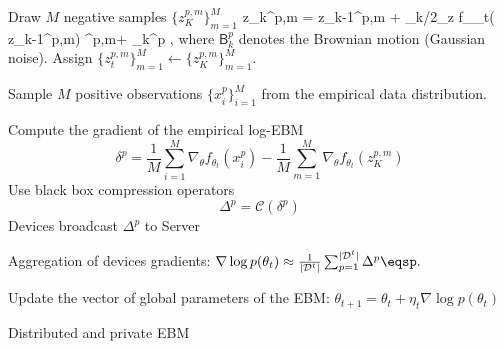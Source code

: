 \documentclass{article}
\begin{document}
\begin{algorithm}[H]
\DontPrintSemicolon
  
\hrulefill

{	
	
	{
		{Draw $M$ negative samples $\{ z_{K}^{p,m} \}_{m=1}^M$} 
			{
			\beq\notag
			z_{k}^{p,m} = z_{k-1}^{p,m} + \gamma_k/2\nabla_z f_{\theta_t}( z_{k-1}^{p,m})  ^{p,m}+  _k^p \eqsp,
			\eeq
			where $\mathsf{B}_k^p$ denotes the Brownian motion (Gaussian noise).
			}
		{Assign $\{ z_{t}^{p,m} \}_{m=1}^M \leftarrow \{ z_{K}^{p,m} \}_{m=1}^M$.}
		
		{Sample $M$ positive observations $\{ x^p_{i} \}_{i=1}^M$ from the empirical data distribution.}
		
		{Compute the gradient of the empirical log-EBM} 
		{
		$$\delta^p = \frac{1}{M} \sum_{i=1}^{M} \nabla_{\theta} f_{\theta_t}\left(x^p_{i}\right)- \frac{1}{M} 	\sum_{m=1}^{M} \nabla_{\theta} f_{\theta_t}\left(z_K^{p,m}\right)$$
		}
		{Use black box compression operators}
		{
		$$\Delta^p = \mathcal{C}(\delta^p )$$
		}
		{Devices broadcast $\Delta^p$ to Server} 
	}
	
	  
	{Aggregation of devices gradients: $\nabla \log p(\theta_t) \approx  \frac{1}{|\mathcal{D}^t|} \sum_{p=1}^{|\mathcal{D}^t|} \Delta^p\eqsp.$}

	{Update the vector of global parameters of the EBM: $\theta_{t+1} = \theta_{t} + \eta_t \nabla \log p(\theta_t)$}
}
\caption{Distributed and private EBM}
\end{algorithm}
\end{document}

